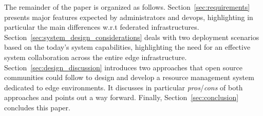 The remainder of the paper is organized as
follows. Section~\ref{sec:requirements} presents major features
expected by administrators and devops, highlighting in particular
the main differences w.r.t federated infrastructures.
Section~\ref{sec:system_design_considerations} deals with two
deployment scenarios based on the today's system capabilities,
highlighting the need for an effective system collaboration across the
entire edge infrastructure. Section~\ref{sec:design_discussion}
introduces two approaches that open source communities could follow to
design and develop a resource management system dedicated to edge
environments. It discusses in particular \emph{pros}/\emph{cons} of
both approaches and points out a way forward. Finally,
Section~\ref{sec:conclusion} concludes this paper.


